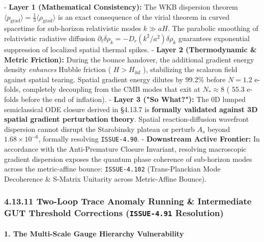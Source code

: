 \documentclass[11pt,a4paper]{article}
\theoremstyle{definition}\newtheorem{definition}{Definition}
\theoremstyle{remark}\newtheorem{remark}{Remark}
\begin{document}
- \textbf{Layer 1 (Mathematical Consistency):} The WKB dispersion theorem $\langle p_{\text{grad}} \rangle = \frac{1}{3} \langle \rho_{\text{grad}} \rangle$ is an exact consequence of the virial theorem in curved spacetime for sub-horizon relativistic modes $k \gg aH$. The parabolic smoothing of relativistic radiative diffusion $\partial_t \delta\rho_k = - D_r (k^2/a^2) \delta\rho_k$ guarantees exponential suppression of localized spatial thermal spikes.
- \textbf{Layer 2 (Thermodynamic \& Metric Friction):} During the bounce handover, the additional gradient energy density \textit{enhances} Hubble friction ( $H > H_{\text{inf}}$ ), stabilizing the scalaron field against spatial tearing. Spatial gradient energy dilutes by 99.2\% before $N = 1.2$ e-folds, completely decoupling from the CMB modes that exit at $N_* \approx 8$ ( $55.3$ e-folds before the end of inflation).
- \textbf{Layer 3 ("So What?"):} The 0D lumped semiclassical ODE closure derived in §4.13.7 is \textbf{formally validated against 3D spatial gradient perturbation theory}. Spatial reaction-diffusion wavefront dispersion cannot disrupt the Starobinsky plateau or perturb $A_s$ beyond $1.68 \times 10^{-6}$, formally resolving \texttt{ISSUE-4.90}.
- \textbf{Downstream Active Frontier:} In accordance with the Anti-Premature Closure Invariant, resolving macroscopic gradient dispersion exposes the quantum phase coherence of sub-horizon modes across the metric-affine bounce: \texttt{ISSUE-4.102} (Trans-Planckian Mode Decoherence \& S-Matrix Unitarity across Metric-Affine Bounce).
\subsubsection{4.13.11 Two-Loop Trace Anomaly Running \& Intermediate GUT Threshold Corrections (\texttt{ISSUE-4.91} Resolution)}
\paragraph{1. The Multi-Scale Gauge Hierarchy Vulnerability}
\end{document}
